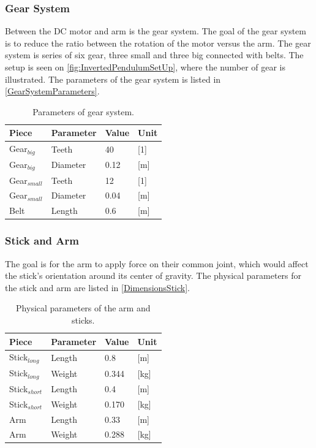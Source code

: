 	
\newpage
\subsubsection{Gear System}
Between the DC motor and arm is the gear system. The goal of the gear system is to reduce the ratio between the rotation of the motor versus the arm. The gear system is series of six gear, three small and three big connected with belts. The setup is seen on \autoref{fig:InvertedPendulumSetUp}, where the number of gear is illustrated. The parameters of the gear system is listed in \autoref{GearSystemParameters}. 

\begin{table}[htbp]
\centering
\caption{Parameters of gear system.}
\label{GearSystemParameters}
\begin{tabular}{llll}
\hline
Piece & Parameter & Value & Unit \\ \hline
Gear$_{big}$ & Teeth & 40 & {[}1{]} \\
Gear$_{big}$ & Diameter & 0.12 & {[}m{]} \\
Gear$_{small}$ & Teeth & 12 & {[}1{]} \\
Gear$_{small}$ & Diameter & 0.04 & {[}m{]} \\
Belt & Length & 0.6 & {[}m{]}
\end{tabular}
\end{table}

\subsubsection{Stick and Arm}
The goal is for the arm to apply force on their common joint, which would affect the stick's orientation around its center of gravity. The physical parameters for the stick and arm are listed in \autoref{DimensionsStick}.

\begin{table}[htbp]
\centering
\caption{Physical parameters of the arm and sticks.}
\label{DimensionsStick}
\begin{tabular}{llll}
\hline
Piece           & Parameter & Value & Unit \\ \hline
Stick$_{long}$  & Length    & 0.8   & [m]    \\
Stick$_{long}$  & Weight    & 0.344 & [kg]    \\ 
Stick$_{short}$ & Length    & 0.4   & [m]    \\
Stick$_{short}$ & Weight    & 0.170 & [kg]    \\ 
Arm             & Length    & 0.33  & [m]    \\
Arm             & Weight    & 0.288   & [kg]   \\ 
\end{tabular}
\end{table}
\newpage

